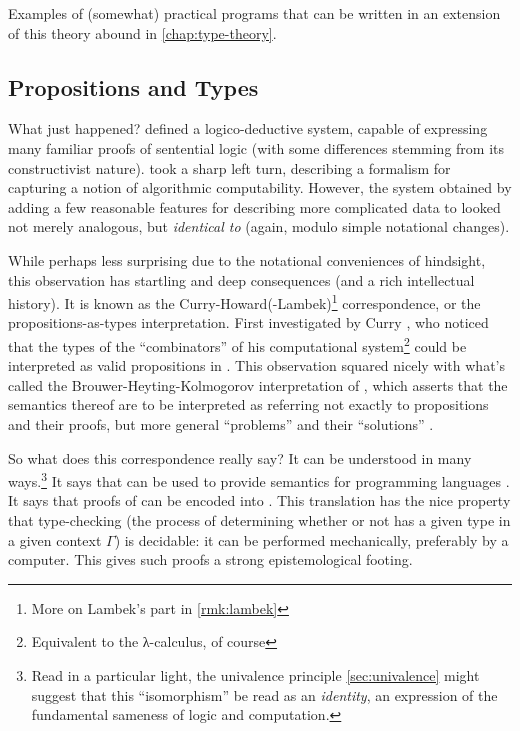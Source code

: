 \documentclass[12pt,twoside]{reedthesis}
\begin{document}
Examples of (somewhat) practical programs that can be written in an extension
of this theory abound in \cref{chap:type-theory}.

\subsection{Propositions and Types}
\label{sec:propositions-and-types}

What just happened?  defined a logico-deductive system, capable of
expressing many familiar proofs of sentential logic (with some differences
stemming from its constructivist nature).  took a
sharp left turn, describing a formalism for capturing a notion of algorithmic
computability. However, the system obtained by adding a few reasonable features
for describing more complicated data to \STLC{} looked not merely
analogous, but \textit{identical to} \IPL{} (again, modulo simple
notational changes).

While perhaps less surprising due to the notational conveniences of hindsight,
this observation has startling and deep consequences (and a rich intellectual
history). It is known as the 
Curry-Howard(-Lambek)\footnote{More on Lambek's part in \cref{rmk:lambek}}
correspondence, or the propositions-as-types interpretation. First investigated
by Curry \cite{curry-howard}, who noticed that the types of the ``combinators''
of his computational system\footnote{Equivalent to the λ-calculus, of course}
could be interpreted as valid propositions in \IPL{}. This
observation squared nicely with what's called the Brouwer-Heyting-Kolmogorov
interpretation of \IPL{}, which asserts that the semantics thereof
are to be interpreted as referring not exactly to propositions and their proofs,
but more general ``problems'' and their ``solutions'' \cite{kolmogorov}.

So what does this correspondence really say? It can be understood in many
ways.\footnote{Read in a particular light, the univalence principle 
  \cref{sec:univalence} might suggest that this ``isomorphism'' be read
  as an \textit{identity}, an expression of the fundamental sameness of logic
  and computation.}
It says that \TLC{} can be used to provide semantics for programming
languages \cite{landin}. It says that proofs of \IPL{} can be
encoded into \TLC{}. This translation has the nice property that
type-checking (the process of determining whether or not has a given type in a
given context $Γ$) is decidable: it can be performed mechanically, preferably by
a computer. This gives such proofs a strong epistemological footing.
\end{document}
